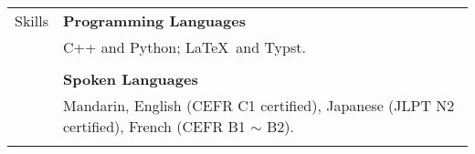 \documentclass[letterpaper, 11pt]{article}
\begin{document}
\begin{center}
\begin{longtable}{p{0.76in}p{5.93in}}
        {\textcolor{OliveGreen}{Skills}} 
        & \textbf{Programming Languages}\\
        & C++ and Python; \LaTeX\ and Typst.\\
        & \\

        & \textbf{Spoken Languages} \\
        & Mandarin, English (CEFR C1 certified), Japanese (JLPT N2 certified), French (CEFR B1 $\sim$ B2).\\
        & \\


        
        
    \end{longtable}
\end{center}
\end{document}
